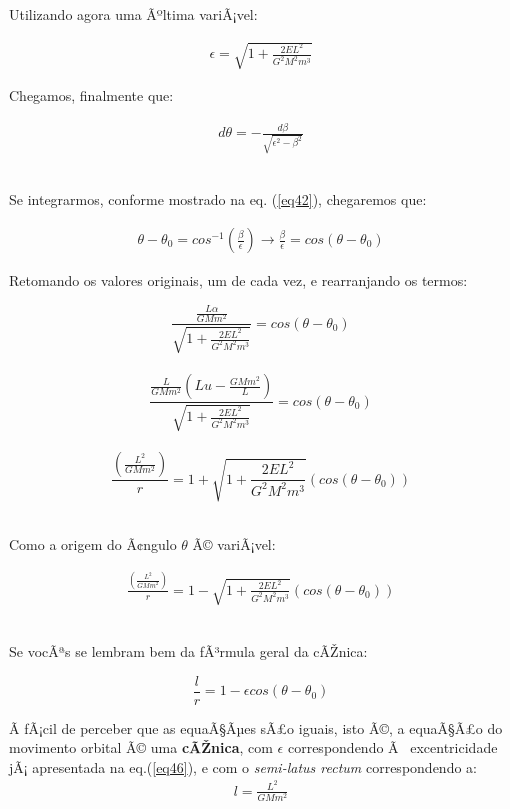 Utilizando agora uma Ãºltima variÃ¡vel:

\begin{eqnarray}
	\epsilon = \sqrt{1 + \frac{2EL^2}{G^2M^2m^3}} \label{eq46}
\end{eqnarray}

Chegamos, finalmente que:

\begin{eqnarray}
	d\theta = -\frac{d\beta}{\sqrt{\epsilon^2 - \beta^2}} \label{eq47}
\end{eqnarray} {\\}

Se integrarmos, conforme mostrado na eq. (\ref{eq42}), chegaremos que:

\begin{eqnarray}
	\theta - \theta_0 = cos^{-1}\left(\frac{\beta}{\epsilon}\right) \rightarrow \frac{\beta}{\epsilon} = cos(\theta - \theta_0) \label{eq48}
\end{eqnarray}

Retomando os valores originais, um de cada vez, e rearranjando os termos:

\[
	\frac{\frac{L\alpha}{GMm^2}}{\sqrt{1 + \frac{2EL^2}{G^2M^2m^3}}} =  cos(\theta - \theta_0)
\] {\\}
\[
	\frac{\frac{L}{GMm^2}\left(Lu-\frac{GMm^2}{L}\right)}{\sqrt{1 + \frac{2EL^2}{G^2M^2m^3}}} =  cos(\theta - \theta_0)
\] {\\}
\[
	\frac{\left(\frac{L^2}{GMm^2}\right)}{r} = 1 + \sqrt{1 + \frac{2EL^2}{G^2M^2m^3}}(cos(\theta - \theta_0))
\]{\\}

Como a origem do Ã¢ngulo $\theta$ Ã© variÃ¡vel:

\begin{eqnarray}
	\frac{\left(\frac{L^2}{GMm^2}\right)}{r} = 1 - \sqrt{1 + \frac{2EL^2}{G^2M^2m^3}}(cos(\theta - \theta_0)) \label{eq49}
\end{eqnarray}{\\}

Se vocÃªs se lembram bem da fÃ³rmula geral da cÃŽnica:

\[
	\frac{l}{r} = 1-\epsilon cos(\theta - \theta_0)
\] 

Ã fÃ¡cil de perceber que as equaÃ§Ãµes sÃ£o iguais, isto Ã©, a equaÃ§Ã£o do movimento orbital Ã© uma \textbf{cÃŽnica}, com $\epsilon$ correspondendo Ã  excentricidade jÃ¡ apresentada na eq.(\ref{eq46}), e com o \textit{semi-latus rectum} correspondendo a:
\begin{eqnarray}
	l = \frac{L^2}{GMm^2} \label{eq50}
\end{eqnarray}

